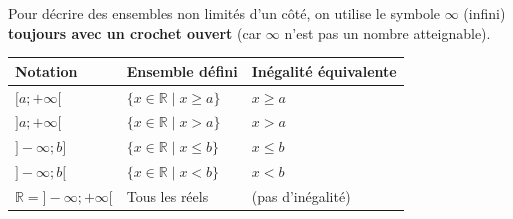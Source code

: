 \documentclass[11pt]{article}
\begin{document}
\begin{definition}
Pour décrire des ensembles non limités d'un côté, on utilise le symbole $\infty$ (infini) \textbf{toujours avec un crochet ouvert} (car $\infty$ n'est pas un nombre atteignable).
\begin{center}
\begin{tabularx}{\linewidth}{|l|X|X|}\hline
\textbf{Notation} & \textbf{Ensemble défini} & \textbf{Inégalité équivalente} \\ \hline
$[a ; +\infty[$ & $\{x \in \mathbb{R} \mid x \ge a\}$ & $x \ge a$ \\ \hline
$]a ; +\infty[$ & $\{x \in \mathbb{R} \mid x > a\}$ & $x > a$ \\ \hline
$]-\infty ; b]$ & $\{x \in \mathbb{R} \mid x \le b\}$ & $x \le b$ \\ \hline
$]-\infty ; b[$ & $\{x \in \mathbb{R} \mid x < b\}$ & $x < b$ \\ \hline
$\mathbb{R} = ]-\infty ; +\infty[$ & Tous les réels & (pas d'inégalité) \\ \hline
\end{tabularx}
\end{center}
\end{definition}
\end{document}

